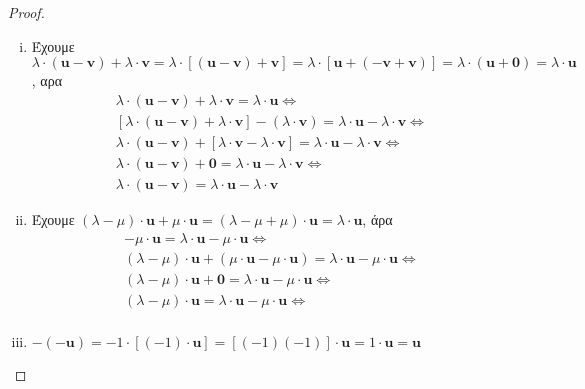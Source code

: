 \begin{proof}
\begin{enumerate}[i)]
        \item Έχουμε $ \lambda\cdot (\mathbf{u} - \mathbf{v}) + \lambda \cdot 
            \mathbf{v} = \lambda \cdot [(\mathbf{u} - \mathbf{v}) + \mathbf{v}] = 
            \lambda \cdot [\mathbf{u} + (- \mathbf{v}+ \mathbf{v})] = \lambda \cdot 
            ( \mathbf{u} + \mathbf{0}) = \lambda \cdot \mathbf{u} $, αρα 
            \begin{gather*}
                \lambda \cdot (\mathbf{u} - \mathbf{v}) + \lambda \cdot \mathbf{v} = 
                \lambda \cdot \mathbf{u} \Leftrightarrow \\ 
                [\lambda \cdot (\mathbf{u} - \mathbf{v}) + \lambda \cdot \mathbf{v}] -
                (\lambda \cdot \mathbf{v})= 
                \lambda \cdot \mathbf{u} - \lambda \cdot \mathbf{v} \Leftrightarrow \\
                \lambda \cdot (\mathbf{u} - \mathbf{v}) + 
                [\lambda \cdot \mathbf{v} - \lambda \cdot \mathbf{v}] =
                \lambda \cdot \mathbf{u} - \lambda \cdot \mathbf{v} \Leftrightarrow \\
                \lambda \cdot (\mathbf{u}- \mathbf{v}) + \mathbf{0} = \lambda \cdot 
                \mathbf{u} - \lambda \cdot \mathbf{v} \Leftrightarrow \\
                \lambda \cdot (\mathbf{u} - \mathbf{v}) = \lambda \cdot \mathbf{u} - 
                \lambda \cdot \mathbf{v}
            \end{gather*}

        \item Έχουμε $ (\lambda - \mu ) \cdot \mathbf{u} + \mu \cdot \mathbf{u} = 
            (\lambda - \mu + \mu )\cdot \mathbf{u} = \lambda \cdot \mathbf{u}$, άρα 
            \begin{gather*}
                [(\lambda - \mu )\cdot \mathbf{u} + \mu \cdot \mathbf{u}] - 
                \mu \cdot \mathbf{u} = \lambda \cdot \mathbf{u}- \mu \cdot 
                \mathbf{u} \Leftrightarrow \\
                (\lambda - \mu ) \cdot \mathbf{u} + (\mu \cdot \mathbf{u} - 
                \mu \cdot \mathbf{u}) = \lambda \cdot \mathbf{u}- \mu \cdot 
                \mathbf{u} \Leftrightarrow \\
                (\lambda - \mu )\cdot \mathbf{u} + \mathbf{0} = 
                \lambda \cdot \mathbf{u}- \mu \cdot \mathbf{u} \Leftrightarrow \\
                (\lambda - \mu )\cdot \mathbf{u} = 
                \lambda \cdot \mathbf{u}- \mu \cdot \mathbf{u} \Leftrightarrow \\
            \end{gather*}

        \item $ -(- \mathbf{u}) = -1\cdot [(-1)\cdot \mathbf{u}] = [(-1)(-1)] \cdot 
            \mathbf{u}= 1 \cdot \mathbf{u} = \mathbf{u} $
    \end{enumerate}
\end{proof}

